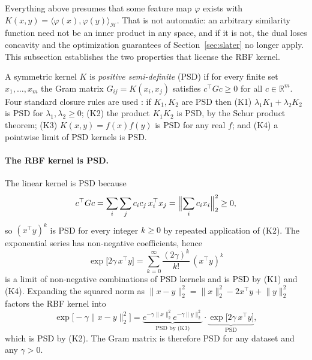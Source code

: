\documentclass[11pt,a4paper]{article}
\numberwithin{equation}{section} %
\begin{document}
Everything above presumes that some feature map $\varphi$ exists with
$K(x,y)=\langle\varphi(x),\varphi(y)\rangle_{\mathcal H}$. That is not
automatic: an arbitrary similarity function need not be an inner product in
any space, and if it is not, the dual loses concavity and the optimization
guarantees of Section~\ref{sec:slater} no longer apply. This subsection
establishes the two properties that license the RBF kernel.

A symmetric kernel $K$ is \emph{positive semi-definite} (PSD) if for every
finite set $x_1,\ldots,x_m$ the Gram matrix $G_{ij}=K(x_i,x_j)$ satisfies
$c^\top Gc\geq0$ for all $c\in\mathbb{R}^m$. Four standard closure rules are
used \cite{boyd2004,lec-statlearn}: if $K_1,K_2$ are PSD then (K1) $\lambda_1K_1+\lambda_2K_2$
is PSD for $\lambda_1,\lambda_2\geq0$; (K2) the product $K_1K_2$ is PSD, by the
Schur product theorem; (K3) $K(x,y)=f(x)f(y)$ is PSD for any real $f$; and
(K4) a pointwise limit of PSD kernels is PSD.

\paragraph{The RBF kernel is PSD.}
The linear kernel is PSD because
\begin{equation}
    c^\top Gc=\sum_{i}\sum_{j}c_ic_j\,x_i^\top x_j
    =\Bigl\lVert\sum_{i}c_ix_i\Bigr\rVert_2^2\geq0,
\end{equation}
so $(x^\top y)^k$ is PSD for every integer $k\geq0$ by repeated application of
(K2). The exponential series has non-negative coefficients, hence
\begin{equation}
    \exp\bigl[2\gamma\,x^\top y\bigr]
    =\sum_{k=0}^{\infty}\frac{(2\gamma)^k}{k!}\,(x^\top y)^k
\end{equation}
is a limit of non-negative combinations of PSD kernels and is PSD by (K1) and
(K4). Expanding the squared norm as
$\lVert x-y\rVert_2^2=\lVert x\rVert_2^2-2x^\top y+\lVert y\rVert_2^2$
factors the RBF kernel into
\begin{equation}
    \exp\bigl[-\gamma\lVert x-y\rVert_2^2\bigr]
    =\underbrace{e^{-\gamma\lVert x\rVert_2^2}
      e^{-\gamma\lVert y\rVert_2^2}}_{\text{PSD by (K3)}}
    \cdot
    \underbrace{\exp\bigl[2\gamma\,x^\top y\bigr]}_{\text{PSD}},
\end{equation}
which is PSD by (K2). The Gram matrix is therefore PSD for any dataset and any
$\gamma>0$.
\end{document}
